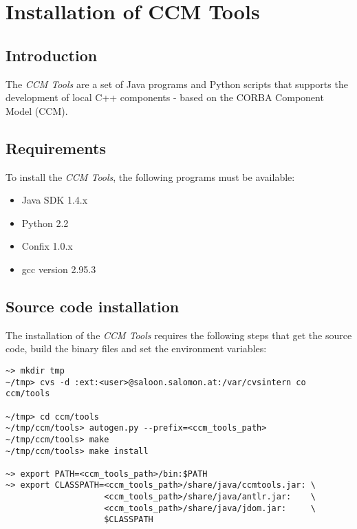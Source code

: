 
\chapter{Installation of CCM Tools}

\section{Introduction}

The {\it CCM Tools} are a set of Java programs and Python scripts that supports
the development of local C++ components - based on the CORBA Component Model (CCM).


\section{Requirements}

To install the {\it CCM Tools}, the following programs must be available:
\begin{itemize}
\item Java SDK 1.4.x
\item Python 2.2
\item Confix 1.0.x
\item gcc version 2.95.3
\end{itemize}

\section{Source code installation}

The installation of the {\it CCM Tools} requires the following steps that get
the source code, build the binary files and set the environment variables:
\begin{verbatim}
~> mkdir tmp
~/tmp> cvs -d :ext:<user>@saloon.salomon.at:/var/cvsintern co ccm/tools

~/tmp> cd ccm/tools
~/tmp/ccm/tools> autogen.py --prefix=<ccm_tools_path>
~/tmp/ccm/tools> make
~/tmp/ccm/tools> make install

~> export PATH=<ccm_tools_path>/bin:$PATH
~> export CLASSPATH=<ccm_tools_path>/share/java/ccmtools.jar: \
                    <ccm_tools_path>/share/java/antlr.jar:    \
                    <ccm_tools_path>/share/java/jdom.jar:     \
                    $CLASSPATH
\end{verbatim}




